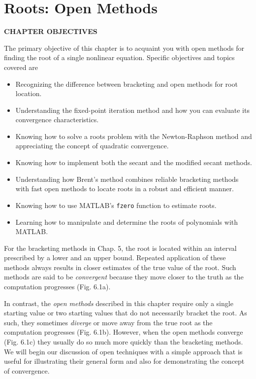\documentclass[../main.tex]{subfiles}
\begin{document}
\chapter{Roots: Open Methods}
\label{chap:chap6}

\begin{center}
    \Large{\textbf{CHAPTER OBJECTIVES}}
\end{center}
The primary objective of this chapter is to acquaint you with open methods for finding
the root of a single nonlinear equation. Specific objectives and topics covered are

\begin{itemize}
    \item Recognizing the difference between bracketing and open methods for root
    location.
    \item Understanding the fixed-point iteration method and how you can evaluate its
    convergence characteristics.
    \item Knowing how to solve a roots problem with the Newton-Raphson method and
    appreciating the concept of quadratic convergence.
    \item Knowing how to implement both the secant and the modified secant methods.
    \item Understanding how Brent's method combines reliable bracketing methods with
    fast open methods to locate roots in a robust and efficient manner.
    \item Knowing how to use MATLAB's \texttt{fzero} function to estimate roots.
    \item Learning how to manipulate and determine the roots of polynomials with
    MATLAB.
\end{itemize}

\noindent For the bracketing methods in Chap. 5, the root is located within an interval prescribed
by a lower and an upper bound. Repeated application of these methods always results
in closer estimates of the true value of the root. Such methods are said to be \emph{convergent}
because they move closer to the truth as the computation progresses (Fig. 6.1a).

In contrast, the \emph{open methods} described in this chapter require only a single starting
value or two starting values that do not necessarily bracket the root. As such, they sometimes
\emph{diverge} or move away from the true root as the computation progresses (Fig. 6.1b).
However, when the open methods converge (Fig. 6.1c) they usually do so much more
quickly than the bracketing methods. We will begin our discussion of open techniques with
a simple approach that is useful for illustrating their general form and also for demonstrating
the concept of convergence.\\
\end{document}
